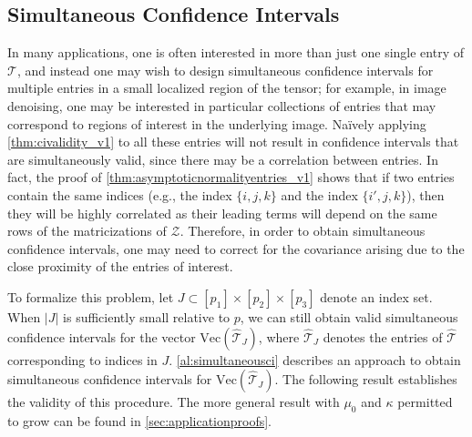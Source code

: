\documentclass[10pt]{article}
\newcommand{\0}{{\mathbf{0}}}
\newcommand{\1}{{\mathbf{1}}}
\renewcommand{\hat}{\widehat}
\renewcommand{\hat}{\widehat}
\begin{document}

\subsection{Simultaneous Confidence Intervals} \label{sec:simultaneous}


In many applications, one is often interested in more than just one single entry of $\mathcal{T}$, and instead one may wish to design simultaneous confidence intervals for multiple entries in a small localized region of the tensor; for example, in image denoising, one may be interested in particular collections of entries that may correspond to regions of interest in the underlying image.  Na\"ively applying \cref{thm:civalidity_v1} to all these entries will not result in confidence intervals that are simultaneously valid, since there may be a correlation between entries. In fact, the proof of \cref{thm:asymptoticnormalityentries_v1} shows that if two entries contain the same indices (e.g., the index $\{i,j,k\}$ and the index $\{i',j,k\}$), then they will be highly correlated as their leading terms will depend on the same rows of the matricizations of $\mathcal{Z}$.  Therefore, in order to obtain simultaneous confidence intervals, one may need to correct for the covariance arising due to the close proximity of the entries of interest.

To formalize this problem, let $J \subset [p_1] \times [p_2] \times [p_3]$ denote an index set.  When $|J|$ is sufficiently small relative to $p$, we can still obtain valid simultaneous confidence intervals for the vector $\mathrm{Vec}(\mathcal{\hat T}_J)$, where $\mathcal{\hat T}_J$ denotes the entries of $\mathcal{\hat T}$ corresponding to indices in $J$.   \cref{al:simultaneousci} describes an approach to obtain simultaneous confidence intervals for $\mathrm{Vec}(\mathcal{\hat T}_J)$. 
The following result establishes the validity of this procedure.  The more general result with $\mu_0$ and $\kappa$ permitted to grow can be found in \cref{sec:applicationproofs}.  %
\end{document}
